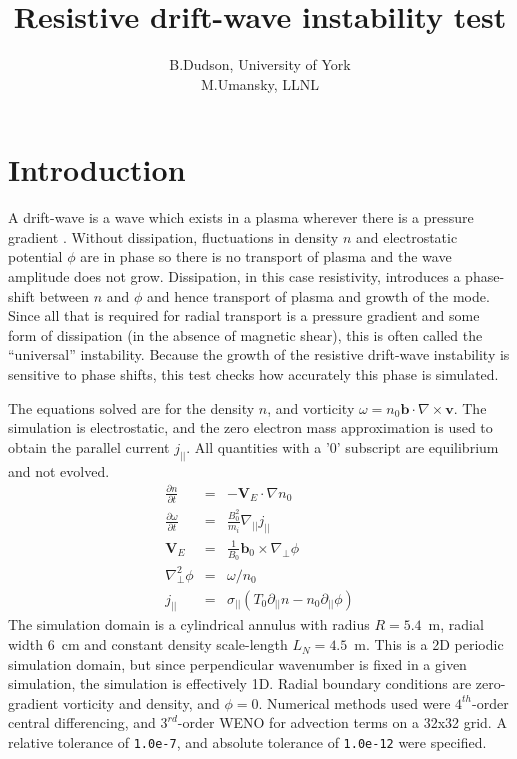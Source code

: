 \documentclass[12pt]{article}
\newcommand{\deriv}[2]{\ensuremath{\frac{\partial #1}{\partial #2}}}
\newcommand{\code}[1]{\texttt{#1}}
\newcommand{\Curl}[1]{\ensuremath{\nabla\times #1 }}
\begin{document}
\title{Resistive drift-wave instability test}
\author{B.Dudson, University of York \\
M.Umansky, LLNL}
\maketitle

\section{Introduction}

A drift-wave is a wave which exists in a plasma wherever there is a pressure
gradient \cite{hazeltine-2003}.
Without dissipation, fluctuations in density $n$ and electrostatic
potential $\phi$ are in phase
so there is no transport of plasma and the wave amplitude does not grow.
Dissipation, in this case resistivity, introduces a phase-shift
between $n$ and $\phi$ and hence transport of plasma and growth of the mode.
Since all that is required for radial transport is a pressure gradient
and some form of dissipation (in the absence of magnetic shear), this is often called the ``universal''
instability. 
Because the growth of the resistive drift-wave instability is sensitive to
phase shifts, this test checks how accurately this phase is simulated.

The equations solved are for the density $n$, and vorticity
$\omega = n_0\mathbf{b}\cdot\Curl{\mathbf{v}}$.
The simulation is electrostatic, and the zero electron mass approximation
is used to obtain the parallel current $j_{||}$. All quantities with a '$0$'
subscript are equilibrium and not evolved.
\begin{eqnarray*}
\deriv{n}{t} &=& -\mathbf{V}_E\cdot\nabla n_0 \\
\deriv{\omega}{t} &=& \frac{B_0^2}{m_i}\nabla_{||}j_{||} \\
\mathbf{V}_E &=& \frac{1}{B_0}\mathbf{b}_0\times\nabla_\perp\phi \\
\nabla_\perp^2\phi &=& \omega/n_0 \\
j_{||} &=& \sigma_{||}\left(T_0\partial_{||}n - n_0\partial_{||}\phi\right)
\end{eqnarray*}
The simulation domain is a cylindrical annulus with radius $R = 5.4$~m, radial width $6$~cm and constant
density scale-length $L_N = 4.5$~m. This is a 2D periodic simulation domain, but since perpendicular
wavenumber is fixed in a given simulation, the simulation is effectively 1D. Radial boundary conditions are
zero-gradient vorticity and density, and $\phi = 0$. 
Numerical methods used were $4^{th}$-order central differencing, and $3^{rd}$-order WENO for advection terms
on a 32x32 grid. A relative tolerance of \code{1.0e-7}, and absolute tolerance of \code{1.0e-12} were specified.
\end{document}
